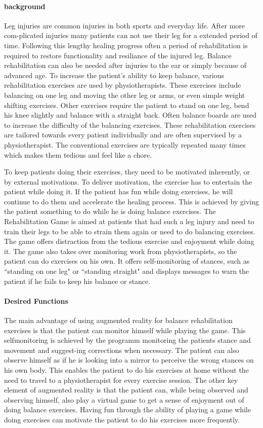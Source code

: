\paragraph{background}
Leg injuries are common injuries in both sports and everyday life. After more com-plicated injuries many patients can not use their leg for a extended period of time. Following this lengthy healing progress often a period of rehabilitation is required to restore functionality and resiliance of the injured leg. Balance rehabilitation can also be needed after injuries to the ear or simply because of advanced age.
To increase the patient's ability to keep balance, various rehabilitation exercises are used by physiotherapists. These exercises include balancing on one leg and moving the other leg or arms, or even simple weight shifting exercises. Other exercises require the patient to stand on one leg, bend his knee slightly and balance with a straight back. Often balance boards are used to increase the difficulty of the balancing exercises. These rehabilitation exercises are tailored towards every patient individually and are often supervised by a physiotherapist. The conventional exercises are typically repeated many times which makes them tedious and feel like a chore.

To keep patients doing their exercises, they need to be motivated inherently, or by external motivations. To deliver motivation, the exercise has to entertain the patient while doing it. If the patient has fun while doing exercises, he will continue to do them and accelerate the healing process. This is achieved by giving the patient something to do while he is doing balance exercises.
The Rehabilitation Game is aimed at patients that had such a leg injury and need to train their legs to be able to strain them again or need to do balancing exercises. The game offers distraction from the tedious exercise and enjoyment while doing it.
The game also takes over monitoring work from physiotherapists, so the patient can do exercises on his own. It offers self-monitoring of stances, such as ``standing on one leg" or ``standing straight" and displays messages to warn the patient if he fails to keep his balance or stance.
\paragraph{Desired Functions}
The main advantage of using augmented reality for balance rehabilitation exercises is that the patient can monitor himself while playing the game. This selfmonitoring is achieved by the programm monitoring the patients stance and movement and suggest-ing corrections when necessary. The patient can also observe himself as if he is looking into a mirror to perceive the wrong stances on his own body. This enables the patient to do his exercises at home without the need to travel to a physiotherapist for every exercise session.
The other key element of augmented reality is that the patient can, while being observed and observing himself, also play a virtual game to get a sense of enjoyment out of doing balance exercises. Having fun through the ability of playing a game while doing exercises can motivate the patient to do his exercises more frequently.

